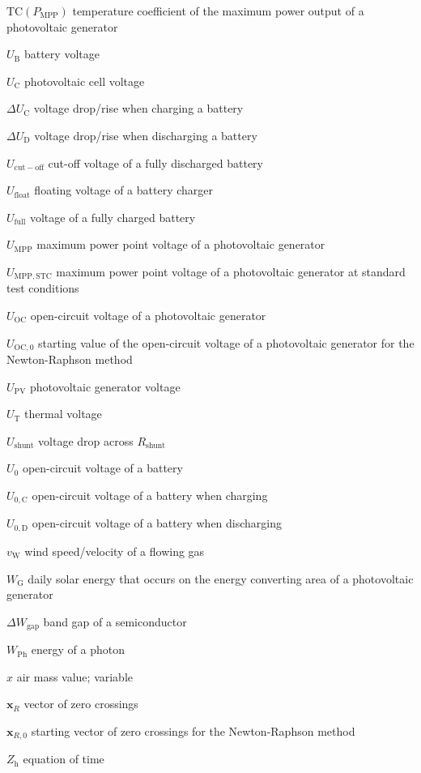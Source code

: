 \begin{symb}
\item[$\mathrm{TC}(P_\mathrm{MPP})$]	temperature coefficient of the maximum power output of a photovoltaic generator
\item[$U_\mathrm{B}$]					battery voltage
\item[$U_\mathrm{C}$]					photovoltaic cell voltage
\item[$\Delta U_\mathrm{C}$]			voltage drop/rise when charging a battery
\item[$\Delta U_\mathrm{D}$]			voltage drop/rise when discharging a battery
\item[$U_\mathrm{cut-off}$]				cut-off voltage of a fully discharged battery
\item[$U_\mathrm{float}$]				floating voltage of a battery charger
\item[$U_\mathrm{full}$]				voltage of a fully charged battery
\item[$U_\mathrm{MPP}$]					maximum power point voltage of a photovoltaic generator
\item[$U_\mathrm{MPP,STC}$]				maximum power point voltage of a photovoltaic generator at standard test conditions
\item[$U_\mathrm{OC}$]					open-circuit voltage of a photovoltaic generator
\item[$U_\mathrm{OC,0}$]				starting value of the open-circuit voltage of a photovoltaic generator for the Newton-Raphson method
\item[$U_\mathrm{PV}$]					photovoltaic generator voltage
\item[$U_\mathrm{T}$]					thermal voltage
\item[$U_\mathrm{shunt}$]				voltage drop across $R_\mathrm{shunt}$
\item[$U_0$]							open-circuit voltage of a battery
\item[$U_{0,\mathrm{C}}$]				open-circuit voltage of a battery when charging
\item[$U_{0,\mathrm{D}}$]				open-circuit voltage of a battery when discharging
\item[$v_\mathrm{W}$]					wind speed/velocity of a flowing gas
\item[$W_\mathrm{G}$]					daily solar energy that occurs on the energy converting area of a photovoltaic generator
\item[$\Delta W_\mathrm{gap}$]			band gap of a semiconductor
\item[$W_\mathrm{Ph}$]					energy of a photon
\item[$x$]								air mass value; variable
\item[$\mathrm{\mathbf{x}}_R$]			vector of zero crossings
\item[$\mathrm{\mathbf{x}}_{R,0}$]		starting vector of zero crossings for the Newton-Raphson method
\item[$Z_\mathrm{h}$]					equation of time


\end{symb}
